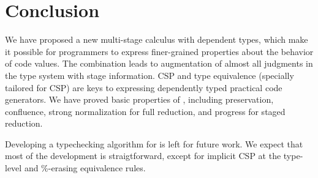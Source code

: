 
\section{Conclusion \label{sec:conclusion}}

We have proposed a new multi-stage calculus \LMD with dependent types,
which make it possible for programmers to express finer-grained
properties about the behavior of code values.  The combination leads
to augmentation of almost all judgments in the type system with stage
information.  CSP and type equivalence (specially tailored for CSP) are
keys to expressing dependently typed practical code generators.  We
have proved basic properties of \LMD, including preservation,
confluence, strong normalization for full reduction, and progress for
staged reduction.

Developing a typechecking algorithm for \LMD is left for future
work.  We expect that most of the development is straigtforward,
except for implicit CSP at the type-level and \%-erasing equivalence
rules.
